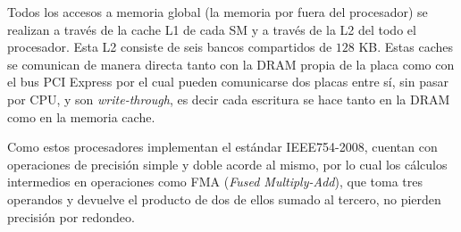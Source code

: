 Todos los accesos a memoria global (la memoria por fuera del procesador) se realizan a trav\'es de la cache L1 de cada SM y a trav\'es de la L2 del todo el procesador.
Esta L2 consiste de seis bancos compartidos de $128$ KB.
Estas caches se comunican de manera directa tanto con la DRAM propia de la placa como con el bus PCI Express por el cual pueden comunicarse dos placas entre s\'i, sin pasar por CPU, y son \textit{write-through}, es decir cada escritura se hace tanto en la DRAM como en la memoria cache.


Como estos procesadores implementan el est\'andar IEEE754-2008, cuentan con operaciones de precisi\'on simple y doble acorde al
mismo, por lo cual los c\'alculos intermedios en operaciones como FMA (\textit{Fused Multiply-Add}), que toma tres operandos y devuelve el producto de dos de ellos sumado al tercero, no pierden precisi\'on por redondeo.


